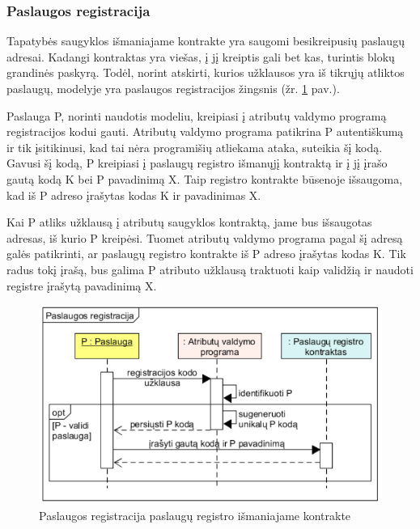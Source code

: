 \subsubsection{Paslaugos registracija} \label{BCIDM:serviceRegistration}

Tapatybės saugyklos išmaniajame kontrakte yra saugomi besikreipusių paslaugų adresai. Kadangi kontraktas yra viešas,
į jį kreiptis gali bet kas, turintis blokų grandinės paskyrą. Todėl, norint atskirti, kurios užklausos yra iš tikrųjų
atliktos paslaugų, modelyje yra paslaugos registracijos žingsnis (žr. \hypertarget{fig:serviceRegistration}{\ref{fig:serviceRegistration}} pav.).

Paslauga P, norinti naudotis modeliu, kreipiasi į atributų valdymo programą registracijos kodui gauti. Atributų valdymo programa
patikrina P autentiškumą ir tik įsitikinusi, kad tai nėra programišių atliekama ataka, suteikia šį kodą. Gavusi šį kodą,
P kreipiasi į paslaugų registro išmanųjį kontraktą ir į jį įrašo gautą kodą K bei P pavadinimą X. Taip registro
kontrakte būsenoje išsaugoma, kad iš P adreso įrašytas kodas K ir pavadinimas X.

Kai P atliks užklausą į atributų
saugyklos kontraktą, jame bus išsaugotas adresas, iš kurio P kreipėsi. Tuomet atributų valdymo programa pagal šį adresą
galės patikrinti, ar paslaugų registro kontrakte iš P adreso įrašytas kodas K.
Tik radus tokį įrašą, bus galima P atributo užklausą traktuoti kaip validžią ir naudoti registre įrašytą pavadinimą X.

\begin{figure}[H]
    \centering
    \includegraphics[scale=0.8]{img/serviceRegistration}
    \caption{Paslaugos registracija paslaugų registro išmaniajame kontrakte}
    \label{fig:serviceRegistration}
\end{figure}

